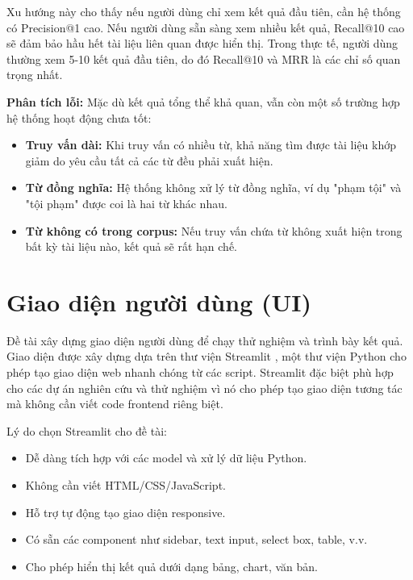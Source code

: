 \documentclass[../BTL.tex]{subfiles}
\begin{document}
Xu hướng này cho thấy nếu người dùng chỉ xem kết quả đầu tiên, cần hệ thống có Precision@1 cao. Nếu người dùng sẵn sàng xem nhiều kết quả, Recall@10 cao sẽ đảm bảo hầu hết tài liệu liên quan được hiển thị. Trong thực tế, người dùng thường xem 5-10 kết quả đầu tiên, do đó Recall@10 và MRR là các chỉ số quan trọng nhất.

\textbf{Phân tích lỗi:}
Mặc dù kết quả tổng thể khả quan, vẫn còn một số trường hợp hệ thống hoạt động chưa tốt:
\begin{itemize}
    \item \textbf{Truy vấn dài:} Khi truy vấn có nhiều từ, khả năng tìm được tài liệu khớp giảm do yêu cầu tất cả các từ đều phải xuất hiện.
    \item \textbf{Từ đồng nghĩa:} Hệ thống không xử lý từ đồng nghĩa, ví dụ "phạm tội" và "tội phạm" được coi là hai từ khác nhau.
    \item \textbf{Từ không có trong corpus:} Nếu truy vấn chứa từ không xuất hiện trong bất kỳ tài liệu nào, kết quả sẽ rất hạn chế.
\end{itemize}


\section{Giao diện người dùng (UI)}
Đề tài xây dựng giao diện người dùng để chạy thử nghiệm và trình bày kết quả. Giao diện được xây dựng dựa trên thư viện Streamlit \cite{streamlit}, một thư viện Python cho phép tạo giao diện web nhanh chóng từ các script. Streamlit đặc biệt phù hợp cho các dự án nghiên cứu và thử nghiệm vì nó cho phép tạo giao diện tương tác mà không cần viết code frontend riêng biệt.

Lý do chọn Streamlit cho đề tài:
\begin{itemize}
    \item Dễ dàng tích hợp với các model và xử lý dữ liệu Python.
    \item Không cần viết HTML/CSS/JavaScript.
    \item Hỗ trợ tự động tạo giao diện responsive.
    \item Có sẵn các component như sidebar, text input, select box, table, v.v.
    \item Cho phép hiển thị kết quả dưới dạng bảng, chart, văn bản.
\end{itemize}
\end{document}
